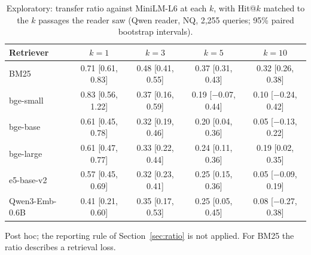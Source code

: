 \begin{table}[t]
\centering
\small
\caption{Exploratory: transfer ratio against MiniLM-L6 at each $k$, with Hit@$k$ matched to the $k$ passages the reader saw (Qwen reader, NQ, 2,255 queries; 95\% paired bootstrap intervals).}
\label{tab:transferk}
\begin{tabular}{lcccc}
\toprule
Retriever & $k=1$ & $k=3$ & $k=5$ & $k=10$ \\
\midrule
BM25 & 0.71 [0.61, 0.83] & 0.48 [0.41, 0.55] & 0.37 [0.31, 0.43] & 0.32 [0.26, 0.38] \\
bge-small & 0.83 [0.56, 1.22] & 0.37 [0.16, 0.59] & 0.19 [$-$0.07, 0.44] & 0.10 [$-$0.24, 0.42] \\
bge-base & 0.61 [0.45, 0.78] & 0.32 [0.19, 0.46] & 0.20 [0.04, 0.36] & 0.05 [$-$0.13, 0.22] \\
bge-large & 0.61 [0.47, 0.77] & 0.33 [0.22, 0.44] & 0.24 [0.11, 0.36] & 0.19 [0.02, 0.35] \\
e5-base-v2 & 0.57 [0.45, 0.69] & 0.32 [0.23, 0.41] & 0.25 [0.15, 0.36] & 0.05 [$-$0.09, 0.19] \\
Qwen3-Emb-0.6B & 0.41 [0.21, 0.60] & 0.35 [0.17, 0.53] & 0.25 [0.05, 0.45] & 0.08 [$-$0.27, 0.38] \\
\bottomrule
\end{tabular}
\par\smallskip\parbox{\linewidth}{\footnotesize Post hoc; the reporting rule of Section~\ref{sec:ratio} is not applied. For BM25 the ratio describes a retrieval loss.}
\end{table}
